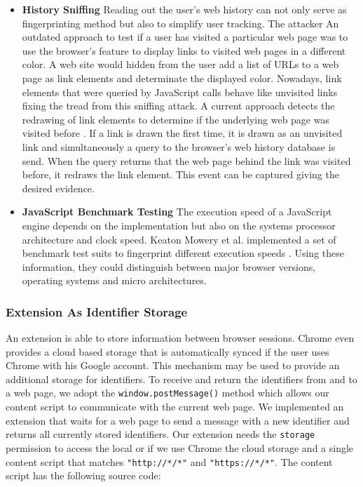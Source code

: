 \documentclass[article,colorback,accentcolor=tud9c,type=bsc]{tudthesis}
\let\stdsubsubsection\subsubsection
\renewcommand\subsubsection{\newpage\stdsubsubsection}
\begin{document}
\begin{itemize}
		\item \textbf{History Sniffing} Reading out the user's web history can not only serve as fingerprinting method but also to simplify user tracking. The attacker  An outdated approach to test if a user has visited a particular web page was to use the browser's feature to display links to visited web pages in a different color. A web site would hidden from the user add a list of URLs to a web page as link elements and determinate the displayed color. Nowadays, link elements that were queried by JavaScript calls behave like unvisited links fixing the tread from this sniffing attack. A current approach detects the redrawing of link elements to determine if the underlying web page was visited before \cite{paulstone_historysniffing}. If a link is drawn the first time, it is drawn as an unvisited link and simultaneously a query to the browser's web history database is send. When the query returns that the web page behind the link was visited before, it redraws the link element. This event can be captured giving the desired evidence.
		
		\item \textbf{JavaScript Benchmark Testing} The execution speed of a JavaScript engine depends on the implementation but also on the systems processor architecture and clock
		speed. Keaton Mowery et al. implemented a set of benchmark test suits to fingerprint different execution speeds \cite{MBYS11}. Using these information, they could distinguish between major browser versions, operating systems and micro architectures. 
	\end{itemize}
	
\subsubsection{Extension As Identifier Storage}
	
	An extension is able to store information between browser sessions. Chrome even provides a cloud based storage that is automatically synced if the user uses Chrome with his Google account. This mechanism may be used to provide an additional storage for identifiers. To receive and return the identifiers from and to a web page, we adopt the \texttt{window.postMessage()} method which allows our content script to communicate with the current web page. We implemented an extension that waits for a web page to send a  message with a new identifier and returns all currently stored identifiers. Our extension needs the \texttt{storage} permission to access the local or if we use Chrome the cloud storage and a single content script that matches \texttt{"http://*/*"} and \texttt{"https://*/*"}. The content script has the following source code: \\
	
\end{document}
